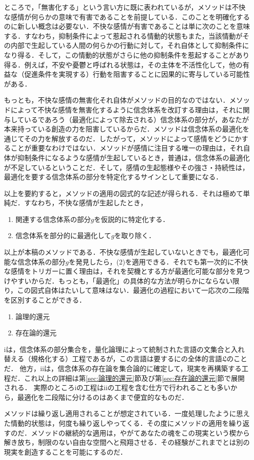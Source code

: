 ところで，「無害化する」という言い方に既に表われているが，メソッドは不快な感情が何らかの意味で有害であることを前提している．このことを明確化するのに新しい概念は必要ない．不快な感情が有害であることは単に次のことを意味する．すなわち，抑制条件によって惹起される情動的状態もまた，当該情動がその内部で生起している人間の何らかの行動に対して，それ自体として抑制条件になり得る．そして，この情動的状態がさらに他の抑制条件を惹起することがあり得る．例えば，不安や憂鬱と呼ばれる状態は，その主体を不活性化して，他の有益な（促進条件を実現する）行動を阻害することに因果的に寄与している可能性がある．

もっとも，不快な感情の無害化それ自体がメソッドの目的なのではない．メソッドによって不快な感情を無害化するように信念体系を改訂する理由は，それに関与しているであろう（最適化によって除去される）信念体系の部分が，あなたが本来持っている創造の力を阻害しているからだ．メソッドは信念体系の最適化を通じてその力を解放するのだ．したがって，メソッドによって感情をどうにかすることが重要なわけではない．メソッドが感情に注目する唯一の理由は，それ自体が抑制条件になるような感情が生起しているとき，普通は，信念体系の最適化が不足しているということだ．そして，感情の生起態様やその強さ・持続性は，最適化を要する信念体系の部分を特定化するサインとして重要になる．

以上を要約すると，メソッドの適用の図式的な記述が得られる．それは極めて単純だ．すなわち，不快な感情が生起したとき，
\begin{enumerate}[label=(\arabic*)]
    \item 関連する信念体系の部分$g$を仮説的に特定化する．
    \item 信念体系を部分的に最適化して$g$を取り除く．
\end{enumerate}
以上が本稿のメソッドである．不快な感情が生起していないときでも，最適化可能な信念体系の部分$g$を発見したら，(2)を適用できる．それでも第一次的に不快な感情をトリガーに置く理由は，それを契機とする方が最適化可能な部分を見つけやすいからだ．もっとも，「最適化」の具体的な方法が明らかにならない限り，この図式自体はたいして意味はない．最適化の過程において一応次の二段階を区別することができる．
\begin{enumerate}[label=\roman*.]
    \item 論理的還元
    \item 存在論的還元
\end{enumerate}
iは，信念体系の部分集合を，量化論理によって統制された言語の文集合と入れ替える（規格化する）工程であるが，この言語は要するにの全体的言語$\mathfrak{L}$のことだ．
他方，iiは，信念体系の存在論を集合論的に確定して，現実を再構築する工程だ．これ以上の詳細は第\ref{sec:論理的還元}節及び第\ref{sec:存在論的還元}節で展開される．
実際のところiの工程はiiの工程を含む仕方で行われることも多いから，最適化を二段階に分けるのはあくまで便宜的なものだ．

メソッドは繰り返し適用されることが想定されている．一度処理したように思えた情動的状態は，何度も繰り返しやってくる．その度にメソッドの適用を繰り返すのだ．メソッドの継続的な適用は，やがてあなたの魂をこの現実という楔から解き放ち，制限のない自由な空間へと飛翔させる．その経験がこれまでとは別の現実を創造することを可能にするのだ．
